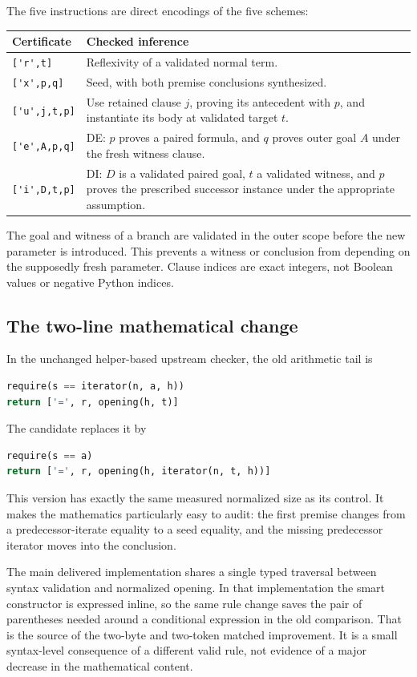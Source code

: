 \documentclass[11pt,letterpaper]{article}
\newcommand{\file}[1]{\nolinkurl{#1}}
\begin{document}
The five instructions are direct encodings of the five schemes:
\begin{center}
\begin{tabularx}{\linewidth}{@{}lX@{}}
\toprule
Certificate & Checked inference\\
\midrule
\file{['r',t]} & Reflexivity of a validated normal term.\\
\file{['x',p,q]} & Seed, with both premise conclusions synthesized.\\
\file{['u',j,t,p]} & Use retained clause $j$, proving its antecedent with $p$,
and instantiate its body at validated target $t$.\\
\file{['e',A,p,q]} & DE: $p$ proves a paired formula, and $q$ proves outer
goal $A$ under the fresh witness clause.\\
\file{['i',D,t,p]} & DI: $D$ is a validated paired goal, $t$ a validated
witness, and $p$ proves the prescribed successor instance under the
appropriate assumption.\\
\bottomrule
\end{tabularx}
\end{center}
The goal and witness of a branch are validated in the outer scope before
the new parameter is introduced. This prevents a witness or conclusion
from depending on the supposedly fresh parameter. Clause indices are
exact integers, not Boolean values or negative Python indices.

\subsection{The two-line mathematical change}

In the unchanged helper-based upstream checker, the old arithmetic tail is
\begin{lstlisting}[language=Python]
require(s == iterator(n, a, h))
return ['=', r, opening(h, t)]
\end{lstlisting}
The candidate replaces it by
\begin{lstlisting}[language=Python]
require(s == a)
return ['=', r, opening(h, iterator(n, t, h))]
\end{lstlisting}
This version has exactly the same measured normalized size as its control.
It makes the mathematics particularly easy to audit: the first premise
changes from a predecessor-iterate equality to a seed equality, and the
missing predecessor iterator moves into the conclusion.

The main delivered implementation shares a single typed traversal between
syntax validation and normalized opening. In that implementation the smart
constructor is expressed inline, so the same rule change saves the pair
of parentheses needed around a conditional expression in the old
comparison. That is the source of the two-byte and two-token matched
improvement. It is a small syntax-level consequence of a different valid
rule, not evidence of a major decrease in the mathematical content.
\end{document}
